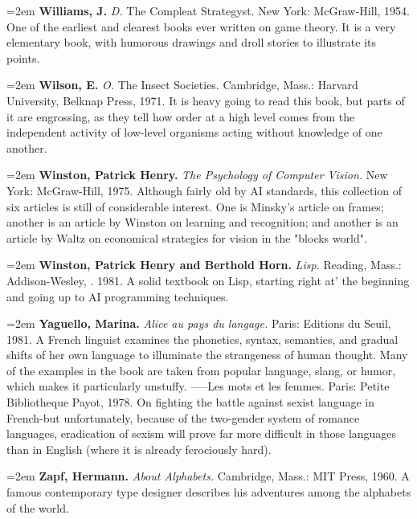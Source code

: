 \par\noindent\hangindent=2em {\bf Williams, J.} {\it D.} The Compleat Strategyst. New York: McGraw-Hill, 1954. One of the earliest and clearest books ever written on game theory. It is a very elementary book, with humorous drawings and droll stories to illustrate its points.

\par\noindent\hangindent=2em {\bf Wilson, E.} {\it O.} The Insect Societies. Cambridge, Mass.: Harvard University, Belknap Press, 1971. It is heavy going to read this book, but parts of it are engrossing, as they tell how order at a high level comes from the independent activity of low-level organisms acting without knowledge of one another.

\par\noindent\hangindent=2em {\bf Winston, Patrick Henry.} {\it The Psychology of Computer Vision.} New York: McGraw-Hill, 1975. Although fairly old by AI standards, this collection of six articles is still of considerable interest. One is Minsky's article on frames; another is an article by Winston on learning and recognition; and another is an article by Waltz on economical strategies for vision in the "blocks world".

\par\noindent\hangindent=2em {\bf Winston, Patrick Henry and Berthold Horn.} {\it Lisp.} Reading, Mass.: Addison-Wesley, . 1981. A solid textbook on Lisp, starting right at' the beginning and going up to AI programming techniques.

\par\noindent\hangindent=2em {\bf Yaguello, Marina.} {\it Alice au pays du langage.} Paris: Editions du Seuil, 1981. A French linguist examines the phonetics, syntax, semantics, and gradual shifts of her own language to illuminate the strangeness of human thought. Many of the examples in the book are taken from popular language, slang, or humor, which makes it particularly unstuffy. -----Les mots et les femmes. Paris: Petite Bibliotheque Payot, 1978. On fighting the battle against sexist language in French-but unfortunately, because of the two-gender system of romance languages, eradication of sexism will prove far more difficult in those languages than in English (where it is already ferociously hard).

\par\noindent\hangindent=2em {\bf Zapf, Hermann.} {\it About Alphabets.} Cambridge, Mass.: MIT Press, 1960. A famous contemporary type designer describes his adventures among the alphabets of the world.
